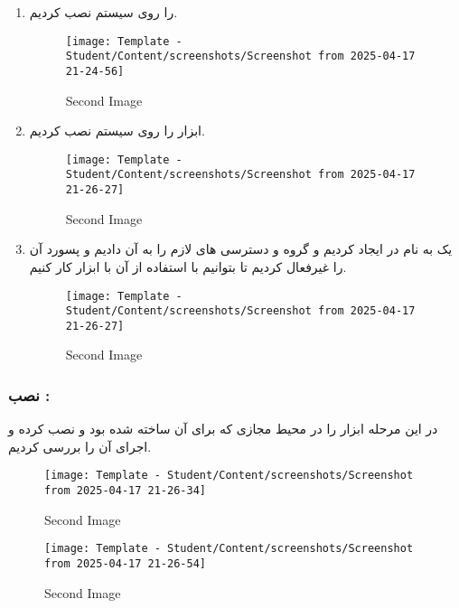 \begin{enumerate}
\begin{figure}[htbp]
    \end{figure}
    \item {} را روی سیستم نصب کردیم.
    \begin{figure}[htbp]
      \centering
      \texttt{[image: Template - Student/Content/screenshots/Screenshot from 2025-04-17 21-24-56]}
      \caption{Second Image}
      \label{fig:vert2}
    \end{figure}
    \item ابزار  را روی سیستم نصب کردیم.
    \begin{figure}[htbp]
      \centering
      \texttt{[image: Template - Student/Content/screenshots/Screenshot from 2025-04-17 21-26-27]}
      \caption{Second Image}
      \label{fig:vert2}
    \end{figure}
    \item یک  به نام  در  ایجاد کردیم و گروه و دسترسی های لازم را به آن دادیم و پسورد آن را غیرفعال کردیم تا بتوانیم با استفاده از آن با ابزار  کار کنیم.
    \begin{figure}[htbp]
      \centering
      \texttt{[image: Template - Student/Content/screenshots/Screenshot from 2025-04-17 21-26-27]}
      \caption{Second Image}
      \label{fig:vert2}
    \end{figure}
\end{enumerate}
\subsubsection*{نصب :}
در این مرحله ابزار  را در محیط مجازی که برای آن ساخته شده بود و  نصب کرده و اجرای آن را بررسی کردیم. 
\begin{figure}[htbp]
      \centering
      \texttt{[image: Template - Student/Content/screenshots/Screenshot from 2025-04-17 21-26-34]}
      \caption{Second Image}
      \label{fig:vert2}
    \end{figure}
    \begin{figure}[htbp]
      \centering
      \texttt{[image: Template - Student/Content/screenshots/Screenshot from 2025-04-17 21-26-54]}
      \caption{Second Image}
      \label{fig:vert2}
    \end{figure}
